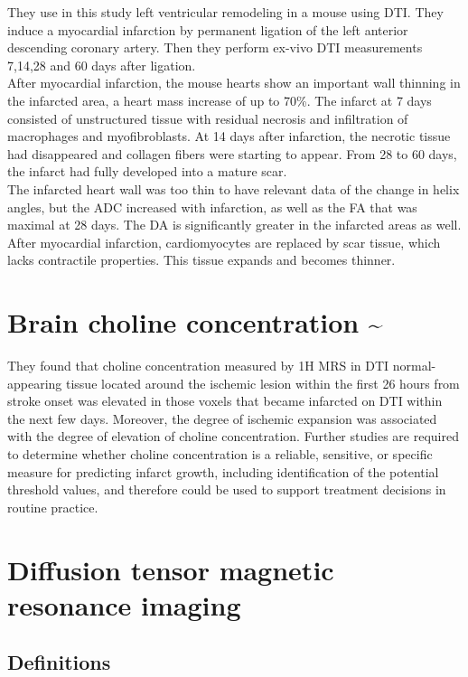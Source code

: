 They use in this study left ventricular remodeling in a mouse using DTI. They induce a myocardial infarction by permanent ligation of the left anterior descending coronary artery. Then they perform ex-vivo DTI measurements 7,14,28 and 60 days after ligation.\\
After myocardial infarction, the mouse hearts show an important wall thinning in the infarcted area, a heart mass increase of up to 70\%.
The infarct at 7 days consisted of unstructured tissue with residual necrosis and infiltration of macrophages and myofibroblasts. At 14 days after infarction, the necrotic tissue had disappeared and collagen fibers were starting to appear. From 28 to 60 days, the infarct had fully developed into a mature scar.\\
The infarcted heart wall was too thin to have relevant data of the change in helix angles, but the ADC increased with infarction, as well as the FA that was maximal at 28 days. The DA is significantly greater in the infarcted areas as well.\\
After myocardial infarction, cardiomyocytes are replaced by scar tissue, which lacks contractile properties. This tissue expands and becomes thinner.

\section{Brain choline concentration \~{}}

They found that choline concentration measured by 1H MRS in DTI normal-appearing tissue located around the ischemic lesion within the first 26 hours from stroke onset was elevated in those voxels that became infarcted on DTI within the next few days. Moreover, the degree of ischemic expansion was associated with the degree of elevation of choline concentration. Further studies are required to determine whether choline concentration is a reliable, sensitive, or specific measure for predicting infarct growth, including identification of the potential threshold values, and therefore could be used to support treatment decisions in routine practice.

\section{Diffusion tensor magnetic resonance imaging}

\subsection{Definitions}


